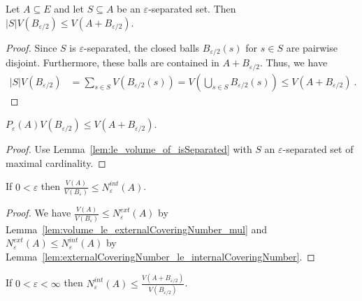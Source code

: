\begin{lemma}\label{lem:le_volume_of_isSeparated}
  \leanok
Let $A \subseteq E$ and let $S \subseteq A$ be an $\varepsilon$-separated set.
Then $\vert S \vert V(B_{\varepsilon/2}) \le V(A + B_{\varepsilon/2})$.
\end{lemma}

\begin{proof}\leanok
Since $S$ is $\varepsilon$-separated, the closed balls $B_{\varepsilon/2}(s)$ for $s \in S$ are pairwise disjoint.
Furthermore, these balls are contained in $A + B_{\varepsilon/2}$.
Thus, we have
\begin{align*}
  \vert S \vert V(B_{\varepsilon/2})
  &= \sum_{s \in S} V(B_{\varepsilon/2}(s))
  = V(\bigcup_{s \in S} B_{\varepsilon/2}(s))
  \le V(A + B_{\varepsilon/2})
  \: .
\end{align*}
\end{proof}


\begin{lemma}\label{lem:packingNumber_mul_le_volume}
  \leanok
$P_\varepsilon(A) V(B_{\varepsilon/2}) \le V(A + B_{\varepsilon/2})$.
\end{lemma}

\begin{proof}\leanok
Use Lemma~\ref{lem:le_volume_of_isSeparated} with $S$ an $\varepsilon$-separated set of maximal cardinality.
\end{proof}


\begin{lemma}\label{lem:volume_div_le_internalCoveringNumber}
  \leanok
If $0 < \varepsilon$ then $\frac{V(A)}{V(B_\varepsilon)} \le N^{int}_\varepsilon(A)$.
\end{lemma}

\begin{proof}\leanok
We have $\frac{V(A)}{V(B_\varepsilon)} \le N^{ext}_\varepsilon(A)$ by Lemma~\ref{lem:volume_le_externalCoveringNumber_mul} and $N^{ext}_\varepsilon(A) \le N^{int}_\varepsilon(A)$ by Lemma~\ref{lem:externalCoveringNumber_le_internalCoveringNumber}.
\end{proof}


\begin{lemma}\label{lem:internalCoveringNumber_le_volume_div}
  \leanok
If $0 < \varepsilon < \infty$ then $N^{int}_\varepsilon(A) \le \frac{V(A + B_{\varepsilon/2})}{V(B_{\varepsilon/2})}$.
\end{lemma}

